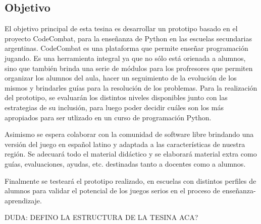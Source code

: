 \subsection{Objetivo}
\label{objetivo}

El objetivo principal de esta tesina es desarrollar un prototipo basado en el proyecto CodeCombat, para la enseñanza de Python en las escuelas secundarias argentinas. CodeCombat es una plataforma que permite enseñar programación jugando. Es una herramienta integral ya que no sólo está orienada a alumnos, sino que también brinda una serie de módulos para los profresores que permiten organizar los alumnos del aula, hacer un seguimiento de la evolución de los mismos y brindarles guías para la resolución de los problemas. Para la realización del prototipo, se evaluarán los distintos niveles disponibles junto con las estrategias de su inclusión, para luego poder decidir cuáles son los más apropiados para ser utlizado en un curso de programación Python.

Asimismo se espera colaborar con la comunidad de software libre brindando una versión del juego en español latino y adaptada a las características de nuestra región. Se adecuará todo el material didáctico y se elaborará material extra como guías, evaluaciones, ayudas, etc. destinadas tanto a docentes como a alumnos.

Finalmente se testeará el prototipo realizado, en escuelas con distintos perfiles de alumnos para validar el potencial de los juegos serios en el proceso de enseñanza-aprendizaje.

DUDA: DEFINO LA ESTRUCTURA DE LA TESINA ACA?